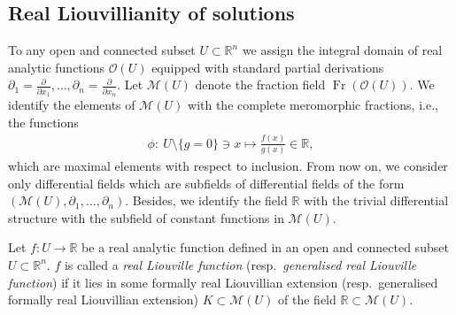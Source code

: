 \documentclass[10pt,a4paper]{amsart}
\numberwithin{equation}{section}
\newcommand{\R}{\mathbb{R}}
\begin{document}
\subsection{Real Liouvillianity of solutions}
To any open and connected subset $U \subset \R^n$ we assign the integral domain of real analytic functions $\mathcal{O}(U)$ equipped with standard partial derivations $\partial_1 = \frac{\partial}{\partial x_1}, \dots ,\partial_n = \frac{\partial}{\partial x_n}$. Let $\mathcal{M}(U)$ denote the fraction field $\operatorname{Fr}(\mathcal{O}(U))$. We identify the elements of $\mathcal{M}(U)$ with the complete meromorphic fractions, i.e., the functions
\begin{gather*}
\phi \colon\ U \setminus \{g=0\}\ni x \mapsto \frac{f(x)}{g(x)} \in \R,
\end{gather*}
which are maximal elements with respect to inclusion.
From now on, we consider only differential fields which are subfields of differential fields of the form $(\mathcal{M}(U),\partial_1, \dots, \partial_n)$. Besides, we identify the field $\R$ with the trivial differential structure with the subfield of constant functions in $\mathcal{M}(U)$.

\begin{Definition} Let $f\colon U \to \R$ be a real analytic function defined in an open and connected subset $U \subset \R^n$. $f$ is called a \emph{real Liouville function} (resp.\ \emph{generalised real Liouville function}) if it lies in some formally real Liouvillian
extension (resp.\ generalised formally real Liouvillian extension) $K \subset \mathcal{M}(U)$ of the field $\R\subset \mathcal{M}(U)$.
\end{Definition}
\end{document}
